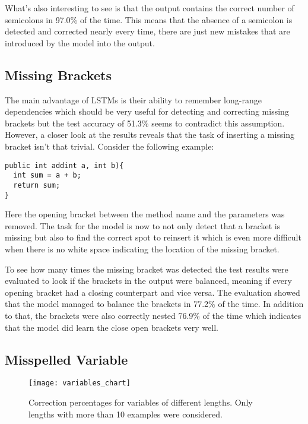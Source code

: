 What's also interesting to see is that the output contains the correct number of semicolons in 97.0\% of the time. This means that the absence of a semicolon is detected and corrected nearly every time, there are just new mistakes that are introduced by the model into the output.

\subsection{Missing Brackets}

The main advantage of LSTMs is their ability to remember long-range dependencies which should be very useful for detecting and correcting missing brackets but the test accuracy of 51.3\% seems to contradict this assumption. However, a closer look at the results reveals that the task of inserting a missing bracket isn't that trivial. Consider the following example:

\begin{lstlisting}[style=inline]
public int addint a, int b){
  int sum = a + b;
  return sum;
}
\end{lstlisting}

Here the opening bracket between the method name and the parameters was removed. The task for the model is now to not only detect that a bracket is missing but also to find the correct spot to reinsert it which is even more difficult when there is no white space indicating the location of the missing bracket.

To see how many times the missing bracket was detected the test results were evaluated to look if the brackets in the output were balanced, meaning if every opening bracket had a closing counterpart and vice versa. The evaluation showed that the model managed to balance the brackets in 77.2\% of the time. In addition to that, the brackets were also correctly nested 76.9\% of the time which indicates that the model did learn the close open brackets very well.

\subsection{Misspelled Variable}

\begin{figure}[t]
\centering
\texttt{[image: variables\_chart]}
\caption{Correction percentages for variables of different lengths. Only lengths with more than 10 examples were considered.}
\label{variables_chart}
\end{figure}

